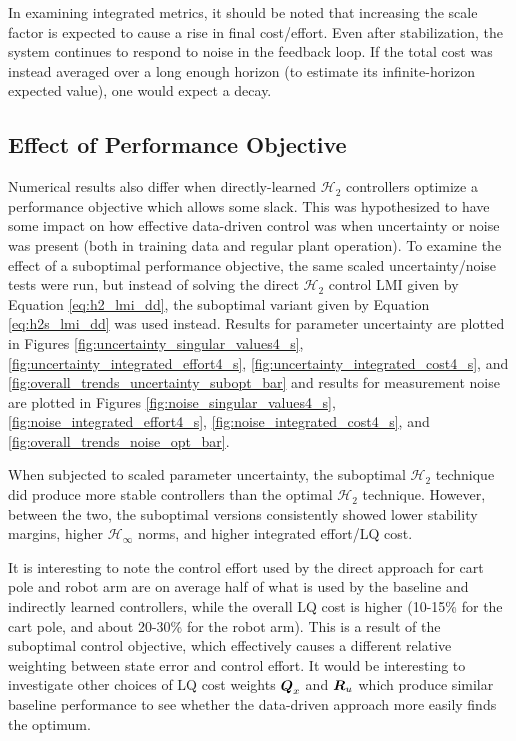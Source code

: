 In examining integrated metrics, it should be noted that increasing the scale factor is expected to cause a rise in final cost/effort.  Even after stabilization, the system continues to respond to noise in the feedback loop.  If the total cost was instead averaged over a long enough horizon (to estimate its infinite-horizon expected value), one would expect a decay.

\subsection{Effect of Performance Objective}
Numerical results also differ when directly-learned $\mathcal{H}_{2}$ controllers optimize a performance objective which allows some slack.  This was hypothesized to have some impact on how effective data-driven control was when uncertainty or noise was present (both in training data and regular plant operation).  To examine the effect of a suboptimal performance objective, the same scaled uncertainty/noise tests were run, but instead of solving the direct $\mathcal{H}_{2}$ control LMI given by Equation \eqref{eq:h2_lmi_dd}, the suboptimal variant given by Equation \eqref{eq:h2s_lmi_dd} was used instead.  Results for parameter uncertainty are plotted in Figures \ref{fig:uncertainty_singular_values4_s}, \ref{fig:uncertainty_integrated_effort4_s}, \ref{fig:uncertainty_integrated_cost4_s}, and \ref{fig:overall_trends_uncertainty_subopt_bar} and results for measurement noise are plotted in Figures \ref{fig:noise_singular_values4_s}, \ref{fig:noise_integrated_effort4_s}, \ref{fig:noise_integrated_cost4_s}, and \ref{fig:overall_trends_noise_opt_bar}.

When subjected to scaled parameter uncertainty, the suboptimal $\mathcal{H}_{2}$ technique did produce more stable controllers than the optimal $\mathcal{H}_{2}$ technique.  However, between the two, the suboptimal versions consistently showed lower stability margins, higher $\mathcal{H}_{\infty}$ norms, and higher integrated effort/LQ cost.

It is interesting to note the control effort used by the direct approach for cart pole and robot arm are on average half of what is used by the baseline and indirectly learned controllers, while the overall LQ cost is higher (10-15\% for the cart pole, and about 20-30\% for the robot arm).  This is a result of the suboptimal control objective, which effectively causes a different relative weighting between state error and control effort.  It would be interesting to investigate other choices of LQ cost weights $\vb*{Q}_{x}$ and $\vb*{R}_{u}$ which produce similar baseline performance to see whether the data-driven approach more easily finds the optimum.
